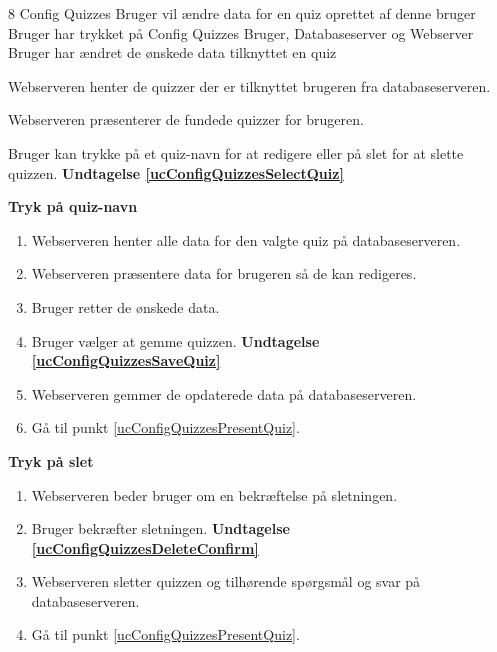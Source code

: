 \uchead
	{8} %
	{Config Quizzes} %
	{Bruger vil ændre data for en quiz oprettet af denne bruger} %
	{Bruger har trykket på Config Quizzes} %
	{Bruger, Databaseserver og Webserver} %
	{} %
	{} %
	{Bruger har ændret de ønskede data tilknyttet en quiz} %


\item\label{ucConfigQuizzesPresentQuiz} Webserveren henter de quizzer der er tilknyttet brugeren fra databaseserveren.

\item Webserveren præsenterer de fundede quizzer for brugeren.

\item\label{ucConfigQuizzesSelectQuiz} Bruger kan trykke på et quiz-navn for at redigere eller på slet for at slette quizzen. \textbf{Undtagelse \ref{ucConfigQuizzesSelectQuiz}}

\textbf{Tryk på quiz-navn}

	\begin{enumerate}
		\item Webserveren henter alle data for den valgte quiz på databaseserveren.
		
		\item Webserveren præsentere data for brugeren så de kan redigeres.
		
		\item Bruger retter de ønskede data.
		
		\item\label{ucConfigQuizzesSaveQuiz} Bruger vælger at gemme quizzen. \textbf{Undtagelse \ref{ucConfigQuizzesSaveQuiz}}
		
		\item Webserveren gemmer de opdaterede data på databaseserveren.
		
		\item Gå til punkt \ref{ucConfigQuizzesPresentQuiz}.
		
	\end{enumerate}

\textbf{Tryk på slet}
	
	\begin{enumerate}
		\item Webserveren beder bruger om en bekræftelse på sletningen.
		
		\item\label{ucConfigQuizzesDeleteConfirm} Bruger bekræfter sletningen. \textbf{Undtagelse \ref{ucConfigQuizzesDeleteConfirm}}
		
		\item Webserveren sletter quizzen og tilhørende spørgsmål og svar på databaseserveren.
		
		\item Gå til punkt \ref{ucConfigQuizzesPresentQuiz}.
		
	\end{enumerate}

